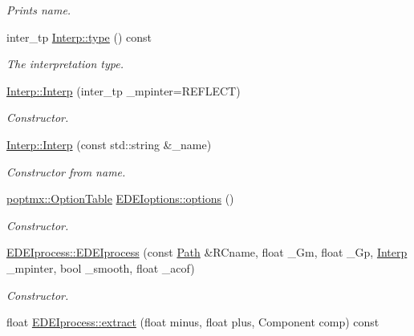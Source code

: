 \begin{DoxyCompactItemize}
\begin{DoxyCompactList}\small\item\em Prints name. \item\end{DoxyCompactList}\item 
inter\_\-tp \hyperlink{group__edeiedei_ga0fb3fe592af6060f4d27b7e59e864808}{Interp::type} () const 
\begin{DoxyCompactList}\small\item\em The interpretation type. \item\end{DoxyCompactList}\item 
\hyperlink{group__edeiedei_ga039d1a049fa99eb2238712041637945e}{Interp::Interp} (inter\_\-tp \_\-mpinter=REFLECT)
\begin{DoxyCompactList}\small\item\em Constructor. \item\end{DoxyCompactList}\item 
\hyperlink{group__edeiedei_ga3d8b610ff638db6518ab5f538bbbae07}{Interp::Interp} (const std::string \&\_\-name)
\begin{DoxyCompactList}\small\item\em Constructor from name. \item\end{DoxyCompactList}\item 
\hyperlink{classpoptmx_1_1OptionTable}{poptmx::OptionTable} \hyperlink{group__edeiedei_gae31714a01a177e8ada6450dbd5a343cc}{EDEIoptions::options} ()
\begin{DoxyCompactList}\small\item\em Constructor. \item\end{DoxyCompactList}\item 
\hyperlink{group__edeiedei_ga8516a2db50344f5d80f2a2fb8a870534}{EDEIprocess::EDEIprocess} (const \hyperlink{classPath}{Path} \&RCname, float \_\-Gm, float \_\-Gp, \hyperlink{classInterp}{Interp} \_\-mpinter, bool \_\-smooth, float \_\-acof)
\begin{DoxyCompactList}\small\item\em Constructor. \item\end{DoxyCompactList}\item 
float \hyperlink{group__edeiedei_gabc1c9c24e29e022479a8e74c8bc7e86a}{EDEIprocess::extract} (float minus, float plus, Component comp) const 
\item 

\end{DoxyCompactItemize}
